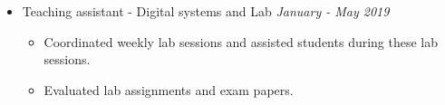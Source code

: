 \documentclass[a4paper,11pt]{article}
\newcommand{\isep}{-2 pt}
\newcommand{\lsep}{-0.5cm}
\newcommand{\spsep}{-0.75cm}
\newcommand{\resheading}[1]{{\large {\begin{minipage}{1\textwidth}{\uppercase{ \textbf{#1}}}\end{minipage}}}}
\begin{document}
\begin{itemize}
	\item Teaching assistant - Digital systems and Lab \hfill \emph{January - May 2019} \\[\spsep]
	\begin{itemize} \itemsep \isep
		\item Coordinated weekly lab sessions and assisted students during these lab sessions. 
		\item Evaluated lab assignments and exam papers.
	\end{itemize}
	
	
\end{itemize}

\end{document}
